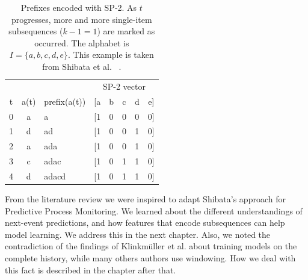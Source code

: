 \begin{table}[!htb]
    \centering
    \begin{tabular}{cclccccc}
        \hline
          &      &              & \multicolumn{5}{c}{SP-2 vector}\\
        t & a(t) & prefix(a(t)) & [a & b & c & d & e]\\
        \hline
        0 & a    & a            & [1 & 0 & 0 & 0 & 0]\\
        1 & d    & ad           & [1 & 0 & 0 & 1 & 0]\\
        2 & a    & ada          & [1 & 0 & 0 & 1 & 0]\\
        3 & c    & adac         & [1 & 0 & 1 & 1 & 0]\\
        4 & d    & adacd        & [1 & 0 & 1 & 1 & 0]\\
        \hline
    \end{tabular}
    \caption[SP-2 feature vector example]{Prefixes encoded with SP-2. As $t$ progresses, more and more single-item subsequences ($k-1=1$) are marked as occurred. The alphabet is $I=\{a,b,c,d,e\}$. This example is taken from Shibata et al. ~\cite{shibata2016bipartite}.}
    \label{tab:sp2-encoding}
\end{table}


From the literature review we were inspired to adapt Shibata's approach for Predictive Process Monitoring.
We learned about the different understandings of next-event predictions, and how
features that encode subsequences can help model learning. We address this in the next chapter.
Also, we noted the contradiction of the findings of Klinkmüller et al. about training models on the complete history, while
many others authors use windowing. How we deal with this fact is described in the chapter after that.
